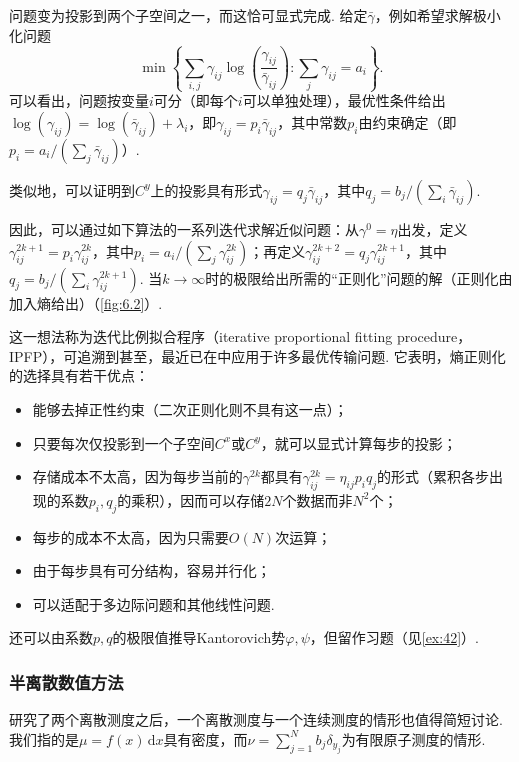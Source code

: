 问题变为投影到两个子空间之一，而这恰可显式完成. 给定$\bar\gamma$，例如希望求解极小化问题
\[
\min\left\{\sum_{i,j}\gamma_{ij}
\log\left(\frac{\gamma_{ij}}{\bar\gamma_{ij}}\right):
\sum_j\gamma_{ij}=a_i\right\}.
\]
可以看出，问题按变量$i$可分（即每个$i$可以单独处理），最优性条件给出$\log(\gamma_{ij})=\log(\bar\gamma_{ij})+\lambda_i$，即$\gamma_{ij}=p_i\bar\gamma_{ij}$，其中常数$p_i$由约束确定（即$p_i=a_i/(\sum_j\bar\gamma_{ij})$）.

类似地，可以证明到$C^y$上的投影具有形式$\gamma_{ij}=q_j\bar\gamma_{ij}$，其中$q_j=b_j/(\sum_i\bar\gamma_{ij})$.

因此，可以通过如下算法的一系列迭代求解近似问题：从$\gamma^0=\eta$出发，定义$\gamma_{ij}^{2k+1}=p_i\gamma_{ij}^{2k}$，其中$p_i=a_i/(\sum_j\gamma_{ij}^{2k})$；再定义$\gamma_{ij}^{2k+2}=q_j\gamma_{ij}^{2k+1}$，其中$q_j=b_j/(\sum_i\gamma_{ij}^{2k+1})$. 当$k\to\infty$时的极限给出所需的“正则化”问题的解（正则化由加入熵给出）（\autoref{fig:6.2}）.

\label{idx:i80-p241}
这一想法称为迭代比例拟合程序（iterative proportional fitting procedure，IPFP），可追溯到\cite{b142}甚至\cite{b282}，最近已在\cite{b38}中应用于许多最优传输问题. 它表明，熵正则化的选择具有若干优点：
\begin{itemize}
\item 能够去掉正性约束（二次正则化则不具有这一点）；
\item 只要每次仅投影到一个子空间$C^x$或$C^y$，就可以显式计算每步的投影；
\item 存储成本不太高，因为每步当前的$\gamma^{2k}$都具有$\gamma_{ij}^{2k}=\eta_{ij}p_iq_j$的形式（累积各步出现的系数$p_i,q_j$的乘积），因而可以存储$2N$个数据而非$N^2$个；
\item 每步的成本不太高，因为只需要$O(N)$次运算；
\item 由于每步具有可分结构，容易并行化；
\item {}\label{idx:i104-p241}
可以适配于多边际问题和其他线性问题.
\end{itemize}
还可以由系数$p,q$的极限值推导Kantorovich势$\varphi,\psi$，但留作习题（见\autoref{ex:42}）.

\subsubsection{半离散数值方法}\label{sec:6.4.2}
研究了两个离散测度之后，一个离散测度与一个连续测度的情形也值得简短讨论. 我们指的是$\mu=f(x)\,\mathrm dx$具有密度，而$\nu=\sum_{j=1}^N b_j\delta_{y_j}$为有限原子测度的情形.

